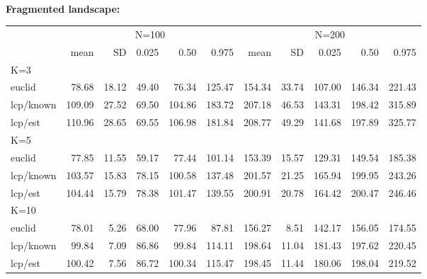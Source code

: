 \documentclass[12pt]{article}
\begin{document}
\begin{table}[h!]
{\begin{tabular}{l|rrrrr|rrrrr}
\end{tabular}
\\
{\bf Fragmented landscape: } \\ %
\begin{tabular}{l|rrrrrrrrrr}
         & \multicolumn{5}{c}{N=100  } & \multicolumn{5}{c}{N=200   }  \\
         &   mean &  SD  & 0.025 & 0.50  & 0.975  & mean  & SD   & 0.025 & 0.50  & 0.975 \\ \hline
K=3      &        &      &       &       &        &       &      &       &       &       \\
euclid   &  78.68 & 18.12& 49.40 & 76.34 & 125.47 & 154.34& 33.74& 107.00& 146.34& 221.43\\
lcp/known& 109.09 & 27.52& 69.50 &104.86 & 183.72 & 207.18& 46.53& 143.31& 198.42& 315.89\\
lcp/est  & 110.96 & 28.65& 69.55 &106.98 & 181.84 & 208.77& 49.29& 141.68& 197.89& 325.77\\
K=5      &        &      &       &       &        &       &      &       &       &        \\
euclid   &  77.85 & 11.55& 59.17 & 77.44 & 101.14 & 153.39& 15.57& 129.31& 149.54& 185.38\\
lcp/known& 103.57 & 15.83& 78.15 &100.58 & 137.48 & 201.57& 21.25& 165.94& 199.95& 243.26\\
lcp/est  & 104.44 & 15.79& 78.38 &101.47 & 139.55 & 200.91& 20.78& 164.42& 200.47& 246.46\\
K=10     &        &      &       &       &        &       &      &       &       &       \\
euclid   &  78.01 & 5.26 & 68.00 & 77.96 & 87.81  & 156.27&  8.51& 142.17& 156.05& 174.55\\
lcp/known&  99.84 & 7.09 & 86.86 & 99.84 & 114.11 & 198.64& 11.04& 181.43& 197.62& 220.45\\
lcp/est  & 100.42 & 7.56 & 86.72 &100.34 & 115.47 & 198.45& 11.44& 180.06& 198.04& 219.52\\ \hline
\end{tabular}
}
\label{tab.results1}
\end{table}
\end{document}
